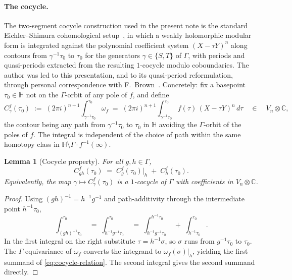 \documentclass[11pt]{article}
\newtheorem{lemma}[theorem]{Lemma}
\numberwithin{equation}{section}  %
\newcommand{\HH}{\mathbb{H}}
\newcommand{\CC}{\mathbb{C}}
\begin{document}
\paragraph{The cocycle.}
The two-segment cocycle construction used in the present note is the
standard Eichler--Shimura cohomological setup~\cite{KZ1984}, in which a
weakly holomorphic modular form is integrated against the polynomial
coefficient system $(X - \tau Y)^n$ along contours from $\gamma^{-1}\tau_0$
to $\tau_0$ for the generators $\gamma \in \{S, T\}$ of $\Gamma$, with
periods and quasi-periods extracted from the resulting $1$-cocycle
modulo coboundaries.  The author was led to this presentation, and to its
quasi-period reformulation, through personal correspondence with
F.\ Brown~\cite{Brown2019Email}.  Concretely:
fix a basepoint $\tau_0 \in \HH$ not on the $\Gamma$-orbit of any pole
of $f$, and define
\begin{equation}\label{eq:cocycle-def}
  C^f_\gamma(\tau_0)
  \;:=\; (2\pi i)^{n+1}\!\int_{\gamma^{-1}\tau_0}^{\tau_0}\!\omega_f
  \;=\; (2\pi i)^{n+1}\!\int_{\gamma^{-1}\tau_0}^{\tau_0}\!
  f(\tau)\,(X - \tau Y)^n\,d\tau
  \quad \in \quad V_n \otimes \CC,
\end{equation}
the contour being any path from $\gamma^{-1}\tau_0$ to $\tau_0$ in
$\HH$ avoiding the $\Gamma$-orbit of the poles of $f$.  The integral
is independent of the choice of path within the same homotopy class in
$\HH \setminus \Gamma\!\cdot\! f^{-1}(\infty)$.

\begin{lemma}[Cocycle property]\label{lem:cocycle}
For all $g, h \in \Gamma$,
\begin{equation}\label{eq:cocycle-relation}
  C^f_{gh}(\tau_0) \;=\; C^f_g(\tau_0)|_h \;+\; C^f_h(\tau_0).
\end{equation}
Equivalently, the map $\gamma \mapsto C^f_\gamma(\tau_0)$ is a
$1$-cocycle of $\Gamma$ with coefficients in $V_n \otimes \CC$.
\end{lemma}
\begin{proof}
Using $(gh)^{-1} = h^{-1}g^{-1}$ and path-additivity through the
intermediate point $h^{-1}\tau_0$,
\begin{equation}
  \int_{(gh)^{-1}\tau_0}^{\tau_0}
  \;=\; \int_{h^{-1}g^{-1}\tau_0}^{\tau_0}
  \;=\; \int_{h^{-1}g^{-1}\tau_0}^{h^{-1}\tau_0}
  \;+\; \int_{h^{-1}\tau_0}^{\tau_0}.
\end{equation}
In the first integral on the right substitute $\tau = h^{-1}\sigma$, so $\sigma$
runs from $g^{-1}\tau_0$ to $\tau_0$.  The $\Gamma$-equivariance of
$\omega_f$ converts the integrand to $\omega_f(\sigma)|_h$, yielding
the first summand of \eqref{eq:cocycle-relation}.  The second integral
gives the second summand directly.
\end{proof}
\end{document}
